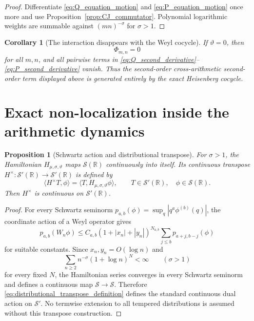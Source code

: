 \documentclass[11pt]{amsart}
\numberwithin{equation}{section}
\theoremstyle{plain}
\newtheorem{proposition}[theorem]{Proposition}
\newtheorem{corollary}[theorem]{Corollary}
\theoremstyle{definition}
\theoremstyle{remark}
\newcommand{\R}{\mathbb{R}}
\newcommand{\Sch}{\mathcal{S}}
\begin{document}
\begin{proof}
Differentiate \eqref{eq:Q_equation_motion} and
\eqref{eq:P_equation_motion} once more and use
Proposition~\ref{prop:CJ_commutator}.  Polynomial logarithmic weights are
summable against $(mn)^{-\sigma}$ for $\sigma>1$.
\end{proof}

\begin{corollary}[The interaction disappears with the Weyl cocycle]
\label{cor:interaction_disappears}
If $\vartheta=0$, then
\begin{equation}
\Phi_{m,n}=0
\label{eq:Phi_zero}
\end{equation}
for all $m,n$, and all pairwise terms in
\eqref{eq:Q_second_derivative}--\eqref{eq:P_second_derivative} vanish.
Thus the second-order cross-arithmetic second-order term displayed above is generated
entirely by the exact Heisenberg cocycle.
\end{corollary}

\section{Exact non-localization inside the arithmetic dynamics}
\label{sec:nonlocalization}

\begin{proposition}[Schwartz action and distributional transpose]
\label{prop:schwartz_distribution_extension}
For \(\sigma>1\), the Hamiltonian
\(H_{\mu,\sigma,\vartheta}\) maps \(\Sch(\R)\) continuously into
itself.  Its continuous transpose
\(H^{\times}:\Sch'(\R)\to\Sch'(\R)\) is defined by
\begin{equation}
\langle H^{\times}T,\phi\rangle
=
\langle T,H_{\mu,\sigma,\vartheta}\phi\rangle,
\qquad
T\in\Sch'(\R),\quad\phi\in\Sch(\R).
\label{eq:distributional_transpose_definition}
\end{equation}
Then \(H^{\times}\) is continuous on \(\Sch'(\R)\).
\end{proposition}

\begin{proof}
For every Schwartz seminorm
\(p_{a,b}(\phi)=\sup_q|q^a\phi^{(b)}(q)|\), the coordinate action of a
Weyl operator gives
\begin{equation}
p_{a,b}(W_n\phi)
\le
C_{a,b}(1+|x_n|+|y_n|)^{N_{a,b}}
\sum_{j\le b}p_{a+j,b-j}(\phi)
\label{eq:weyl_schwartz_bound}
\end{equation}
for suitable constants.  Since \(x_n,y_n=O(\log n)\) and
\begin{equation}
\sum_{n\ge2}n^{-\sigma}(1+\log n)^N<\infty
\qquad(\sigma>1)
\label{eq:log_weight_summability}
\end{equation}
for every fixed \(N\), the Hamiltonian series converges in every Schwartz
seminorm and defines a continuous map \(\Sch\to\Sch\).  Therefore
\eqref{eq:distributional_transpose_definition} defines the standard
continuous dual action on \(\Sch'\).  No termwise extension to all tempered
distributions is assumed without this transpose construction.
\end{proof}
\end{document}
